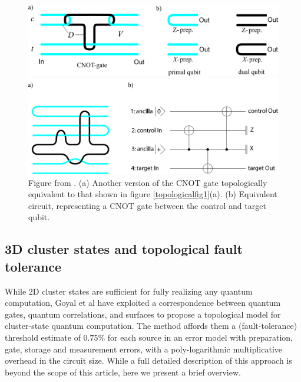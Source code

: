 \documentclass[twocolumn]{Styles/IEEEtran11}
\newcommand{\ie}{{\it i.e., }}
\begin{document}
\begin{figure}[t]
  \centering
  \includegraphics[width=0.7\linewidth]{Images/topological01.png}
  \caption{Figure from \protect\cite{goyal2007}. Topologically protected gates as realized in three-dimensional cluster states. (a) An individual encoded CNOT gate with control $c$ and target $t$. (b) The preparation of logical qubits in the \{$\ket{0}$, $\ket{1}$\} (\ie $Z$-) and the \{$\ket{\pm}$\} (\ie $X$-) bases. The line-like structures are connected defect sites (nodes measured in the $Z$-basis, denoted by set `D') embedded in a 3D lattice, surrounded by sites belonging to set `V' (measured in the $X$-basis). The gate function only depends upon the way the defect lines are wound around one another.}
  \label{topologicalfig1}
  \includegraphics[width=0.7\linewidth]{Images/topological02.png}
  \caption{Figure from \protect\cite{goyal2007}. (a) Another version of the CNOT gate topologically equivalent to that shown in figure \ref{topologicalfig1}(a). (b) Equivalent circuit, representing a CNOT gate between the control and target qubit.}
  \label{topologicalfig2}  
\end{figure}

\subsection{3D cluster states and topological fault tolerance}

While 2D cluster states are sufficient for fully realizing any quantum computation, Goyal et al \cite{goyal2007} have exploited a correspondence between quantum gates, quantum correlations, and surfaces to propose a topological model for cluster-state quantum computation. The method affords them a (fault-tolerance) threshold estimate of $0.75$\% for each source in an error model with preparation, gate, storage and measurement errors, with a poly-logarithmic multiplicative overhead in the circuit size. While a full detailed description of this approach is beyond the scope of this article, here we present a brief overview.
\end{document}
